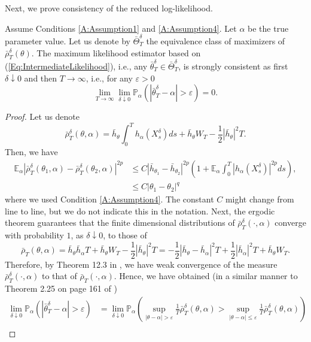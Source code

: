 \documentclass{article}
\begin{document}
Next, we prove consistency of the reduced log-likelihood.
\begin{theorem}\label{T:ConsisitencyReducedLikelihood}
Assume Conditions \ref{A:Assumption1} and \ref{A:Assumption4}. Let $\alpha$ be the true parameter value. Let us denote by $\bar{\Theta}^{\delta}_{T}$ the equivalence class of maximizers of $\bar{\rho}_T^\delta(\theta)$. The maximum likelihood estimator based on (\ref{Eq:IntermediateLikelihood}), i.e., any $\bar{\theta}^{\delta}_{T}\in \bar{\Theta}^{\delta}_{T}$, is strongly consistent as
first $\delta\downarrow 0$ and then $T\rightarrow\infty$, i.e., for any $\varepsilon>0$
\[
\lim_{T\rightarrow\infty}\lim_{\delta\downarrow 0}\mathbb{P}_{\alpha}\left(\left|\bar{\theta}^{\delta}_{T}-\alpha\right|>\varepsilon\right)=0.
\]
\end{theorem}
\begin{proof}
Let us denote
\[
\bar{\rho}_T^\delta(\theta,\alpha)=\bar h_{\theta} \int_{0}^{T}h_{\alpha}(X^{\delta}_{s})ds +\bar h_{\theta} W_{T}-\frac 12|\bar h_{\theta}|^2T.
\]
Then, we have
\begin{align}
\mathbb{E}_{\alpha}\left|\bar{\rho}_T^\delta(\theta_{1},\alpha)-\bar{\rho}_T^\delta(\theta_{2},\alpha) \right|^{2p}&\leq C |\bar{h}_{\theta_{1}}-\bar{h}_{\theta_{2}}|^{2p}
\left(1+\mathbb{E}_{\alpha}\int_{0}^{T}|h_{\alpha}(X^{\delta}_{s})|^{2p}ds \right),\nonumber\\
&\leq C |\theta_{1}-\theta_{2}|^{q}\nonumber
\end{align}
where we used Condition \ref{A:Assumption4}. The constant $C$ might change from line to line, but we do not indicate this in the notation.
Next, the ergodic theorem guarantees that the finite dimensional distributions of $\bar{\rho}^{\delta}_{T}(\cdot,\alpha)$ converge with probability $1$, as $\delta\downarrow 0$, to those of
\[
\bar{\rho}_T(\theta,\alpha)=\bar h_{\theta} \bar h_{\alpha}T +\bar h_{\theta} W_{T}-\frac 12|\bar h_{\theta}|^2T= -\frac{1}{2}|\bar h_{\theta} -\bar h_{\alpha}|^{2}T+\frac{1}{2}|\bar h_{\alpha}|^2T+ \bar{h}_{\theta}W_{T}.
\]
Therefore, by Theorem 12.3 in \cite{Billingsley}, we have weak convergence of the measure $\bar{\rho}^{\delta}_{T}(\cdot,\alpha)$ to that of $\bar{\rho}_{T}(\cdot,\alpha)$. Hence, we have obtained (in a similar manner to Theorem 2.25 on page 161 of \cite{Kutoyants})
\begin{align}
\lim_{\delta\downarrow 0}\mathbb{P}_{\alpha}\left(\left|\bar{\theta}^{\delta}_{T}-\alpha\right|>\varepsilon\right)&=
\lim_{\delta\downarrow 0}\mathbb{P}_{\alpha}\left(\sup_{\left|\theta-\alpha\right|>\varepsilon}\frac{1}{T}\bar{\rho}_{T}^\delta(\theta,\alpha)>\sup_{\left|\theta-\alpha\right|\leq\varepsilon}\frac{1}{T}\bar{\rho}_{T}^\delta(\theta,\alpha)\right)\nonumber\\

\end{align}
\end{proof}
\end{document}
